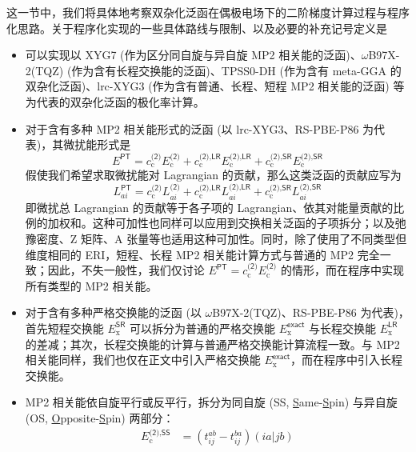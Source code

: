 这一节中，我们将具体地考察双杂化泛函在偶极电场下的二阶梯度计算过程与程序化思路。关于程序化实现的一些具体路线与限制、以及必要的补充记号定义是
\begin{itemize}[nosep]
  \item 可以实现以 XYG7 (作为区分同自旋与异自旋 MP2 相关能的泛函)、$\omega$B97X-2(TQZ) (作为含有长程交换能的泛函)、TPSS0-DH (作为含有 meta-GGA 的双杂化泛函)、lrc-XYG3 (作为含有普通、长程、短程 MP2 相关能的泛函) 等为代表的双杂化泛函的极化率计算。
  \item 对于含有多种 MP2 相关能形式的泛函 (以 lrc-XYG3、RS-PBE-P86 为代表)，其微扰能形式是
        \begin{equation*}
          E^\textsf{PT} = c_\mathrm{c}^\textsf{(2)} E_\mathrm{c}^\textsf{(2)} + c_\mathrm{c}^{\textsf{(2)}, \textsf{LR}} E_\mathrm{c}^{\textsf{(2)}, \textsf{LR}} + c_\mathrm{c}^{\textsf{(2)}, \textsf{SR}} E_\mathrm{c}^{\textsf{(2)}, \textsf{SR}}
        \end{equation*}
        假使我们希望求取微扰能对 Lagrangian 的贡献，那么这类泛函的贡献应写为
        \begin{equation*}
          L_{ai}^\textsf{PT} = c_\mathrm{c}^\textsf{(2)} L_{ai}^\textsf{(2)} + c_\mathrm{c}^{\textsf{(2)}, \textsf{LR}} L_{ai}^{\textsf{(2)}, \textsf{LR}} + c_\mathrm{c}^{\textsf{(2)}, \textsf{SR}} L_{ai}^{\textsf{(2)}, \textsf{SR}}
        \end{equation*}
        即微扰总 Lagrangian 的贡献等于各子项的 Lagrangian、依其对能量贡献的比例的加权和。这种可加性也同样可以应用到交换相关泛函的子项拆分；以及弛豫密度、Z 矩阵、A 张量等也适用这种可加性。同时，除了使用了不同类型但维度相同的 ERI，短程、长程 MP2 相关能计算方式与普通的 MP2 完全一致；因此，不失一般性，我们仅讨论 $E^\textsf{PT} = c_\mathrm{c}^\textsf{(2)} E_\mathrm{c}^\textsf{(2)}$ 的情形，而在程序中实现所有类型的 MP2 相关能。
  \item 对于含有多种严格交换能的泛函 (以 $\omega$B97X-2(TQZ)、RS-PBE-P86 为代表)，首先短程交换能 $E_\mathrm{x}^\textsf{SR}$ 可以拆分为普通的严格交换能 $E_\mathrm{x}^\textsf{exact}$ 与长程交换能 $E_\mathrm{x}^\textsf{LR}$ 的差减；其次，长程交换能的计算与普通严格交换能计算流程一致。与 MP2 相关能同样，我们也仅在正文中引入严格交换能 $E_\mathrm{x}^\textsf{exact}$，而在程序中引入长程交换能。
  \item MP2 相关能依自旋平行或反平行，拆分为同自旋 (SS, \underline{S}ame-\underline{S}pin) 与异自旋 (OS, \underline{O}pposite-\underline{S}pin) 两部分：
        \begin{align}
          E_\mathrm{c}^{\textsf{(2)}, \textsf{SS}} &= (t_{ij}^{ab} - t_{ij}^{ba}) (ia|jb) \\

\end{align}
\end{itemize}
